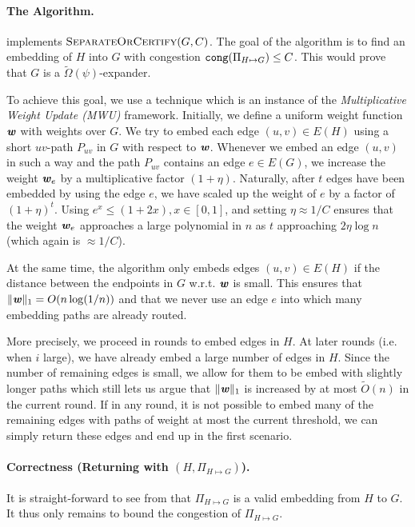 \paragraph{The Algorithm.}  implements $\textsc{SeparateOrCertify}(G, C)$. The goal of the algorithm is to find an embedding of $H$ into $G$ with congestion $\operatorname{\mathtt{cong}}(\Pi_{H \mapsto G}) \leq C$.  This would prove that $G$ is a $\tilde{\Omega}(\psi)$-expander.

To achieve this goal, we use a technique which is an instance of the \emph{Multiplicative Weight Update (MWU)} framework. Initially, we define a uniform weight function $\boldsymbol{\mathit{w}}$ with weights over $G$. We try to embed each edge $(u,v) \in E(H)$ using a short $uv$-path $P_{uv}$ in $G$ with respect to $\boldsymbol{\mathit{w}}$. Whenever we embed an edge $(u,v)$ in such a way and the path $P_{uv}$ contains an edge $e \in E(G)$, we increase the weight $\boldsymbol{\mathit{w}}_e$ by a multiplicative factor $(1+\eta)$. Naturally, after $t$ edges have been embedded by using the edge $e$, we have scaled up the weight of $e$ by a factor of $(1+\eta)^t$. Using $e^x \le (1 + 2x), x \in [0, 1]$, and setting $\eta \approx 1/C$ ensures that the weight $\boldsymbol{\mathit{w}}_e$ approaches a large polynomial in $n$ as $t$ approaching $2\eta \log n$ (which again is $\approx 1/C$). 

At the same time, the algorithm only embeds edges $(u,v) \in E(H)$ if the distance between the endpoints in $G$ w.r.t. $\boldsymbol{\mathit{w}}$ is small. This ensures that $\|\boldsymbol{\mathit{w}}\|_1 = O(n \log(1/n))$ and that we never use an edge $e$ into which many embedding paths are already routed. 

More precisely, we proceed in rounds to embed edges in $H$. At later rounds (i.e. when $i$ large), we have already embed a large number of edges in $H$. Since the number of remaining edges is small, we allow for them to be embed with slightly longer paths which still lets us argue that $\|\boldsymbol{\mathit{w}}\|_1$ is increased by at most $\tilde{O}(n)$ in the current round. If in any round, it is not possible to embed many of the remaining edges with paths of weight at most the current threshold, we can simply return these edges and end up in the first scenario.


\paragraph{Correctness (Returning with $(H, \Pi_{H \mapsto G})$).} It is straight-forward to see from  that $\Pi_{H \mapsto G}$ is a valid embedding from $H$ to $G$. It thus only remains to bound the congestion of $\Pi_{H \mapsto G}$.

